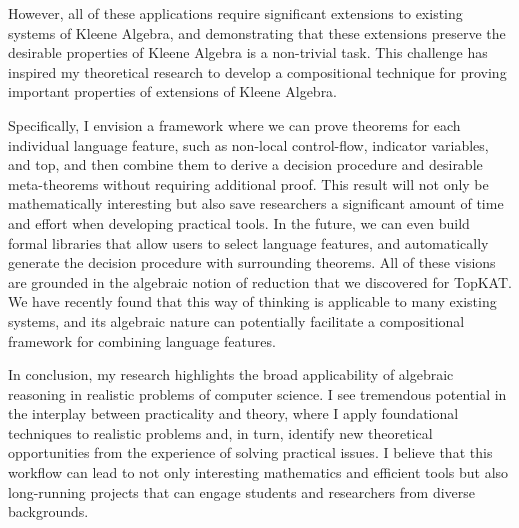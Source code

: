 \documentclass[11pt,a4paper,sans]{moderncv} %
\begin{document}

However, all of these applications require significant extensions to existing systems of Kleene Algebra, and demonstrating that these extensions preserve the desirable properties of Kleene Algebra is a non-trivial task.
This challenge has inspired my theoretical research to develop a compositional technique for proving important properties of extensions of Kleene Algebra. 

Specifically, I envision a framework where we can prove theorems for each individual language feature, such as non-local control-flow, indicator variables, and top, and then combine them to derive a decision procedure and desirable meta-theorems without requiring additional proof. 
This result will not only be mathematically interesting but also save researchers a significant amount of time and effort when developing practical tools.
In the future, we can even build formal libraries that allow users to select language features, and automatically generate the decision procedure with surrounding theorems.
All of these visions are grounded in the algebraic notion of reduction that we discovered for TopKAT. 
We have recently found that this way of thinking is applicable to many existing systems, and its algebraic nature can potentially facilitate a compositional framework for combining language features.

In conclusion, my research highlights the broad applicability of algebraic reasoning in realistic problems of computer science. 
I see tremendous potential in the interplay between practicality and theory, where I apply foundational techniques to realistic problems and, in turn, identify new theoretical opportunities from the experience of solving practical issues.
I believe that this workflow can lead to not only interesting mathematics and efficient tools but also long-running projects that can engage students and researchers from diverse backgrounds.



\newpage
\printbibliography %
\end{document}
